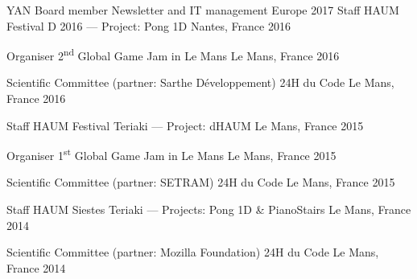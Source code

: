 

\begin{cvhonors}

  \cvhonor
		{YAN Board member} %
		{Newsletter and IT management} %
    {Europe} %
    {2017} %
  \cvhonor
		{Staff HAUM} %
		{Festival D 2016 --- Project: Pong 1D} %
    {Nantes, France} %
    {2016} %

  \cvhonor
    {Organiser} %
		{2\textsuperscript{nd} Global Game Jam in Le Mans} %
    {Le Mans, France} %
    {2016} %

  \cvhonor
		{Scientific Committee (partner: Sarthe Développement)} %
    {24H du Code} %
		{Le Mans, France} %
    {2016} %

  \cvhonor
		{Staff HAUM} %
    {Festival Teriaki --- Project: dHAUM} %
		{Le Mans, France} %
    {2015} %

  \cvhonor
    {Organiser} %
		{1\textsuperscript{st} Global Game Jam in Le Mans} %
    {Le Mans, France} %
    {2015} %

  \cvhonor
		{Scientific Committee (partner: SETRAM)} %
    {24H du Code} %
		{Le Mans, France} %
    {2015} %

  \cvhonor
		{Staff HAUM} %
		{Siestes Teriaki --- Projects: Pong 1D \& PianoStairs} %
		{Le Mans, France} %
    {2014} %

  \cvhonor
		{Scientific Committee (partner: Mozilla Foundation)} %
    {24H du Code} %
		{Le Mans, France} %
    {2014} %

\end{cvhonors}
